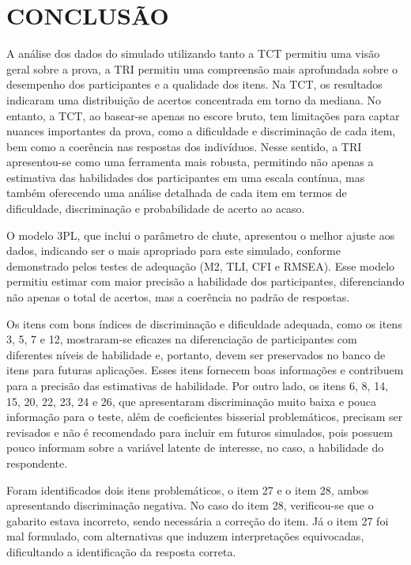 \chapter{CONCLUSÃO}
	

A análise dos dados do simulado utilizando tanto a TCT permitiu uma visão geral sobre a prova, a TRI permitiu uma compreensão mais aprofundada sobre o desempenho dos participantes e a qualidade dos itens. Na TCT, os resultados indicaram uma distribuição de acertos concentrada em torno da mediana. No entanto, a TCT, ao basear-se apenas no escore bruto, tem limitações para captar nuances importantes da prova, como a dificuldade e discriminação de cada item, bem como a coerência nas respostas dos indivíduos. Nesse sentido, a TRI apresentou-se como uma ferramenta mais robusta, permitindo não apenas a estimativa das habilidades dos participantes em uma escala contínua, mas também oferecendo uma análise detalhada de cada item em termos de dificuldade, discriminação e probabilidade de acerto ao acaso.

O modelo 3PL, que inclui o parâmetro de chute, apresentou o melhor ajuste aos dados, indicando ser o mais apropriado para este simulado, conforme demonstrado pelos testes de adequação (M2, TLI, CFI e RMSEA). Esse modelo permitiu estimar com maior precisão a habilidade dos participantes, diferenciando não apenas o total de acertos, mas a coerência no padrão de respostas.

Os itens com bons índices de discriminação e dificuldade adequada, como os itens 3, 5, 7 e 12, mostraram-se eficazes na diferenciação de participantes com diferentes níveis de habilidade e, portanto, devem ser preservados no banco de itens para futuras aplicações. Esses itens fornecem boas informações e contribuem para a precisão das estimativas de habilidade. Por outro lado, os itens 6, 8, 14, 15, 20, 22, 23, 24 e 26, que apresentaram discriminação muito baixa e pouca informação para o teste, além de coeficientes bisserial problemáticos, precisam ser revisados e não é recomendado para incluir em futuros simulados, pois possuem pouco informam sobre a variável latente de interesse, no caso, a habilidade do respondente.

Foram identificados dois itens problemáticos, o item 27 e o item 28, ambos apresentando discriminação negativa. No caso do item 28, verificou-se que o gabarito estava incorreto, sendo necessária a correção do item. Já o item 27 foi mal formulado, com alternativas  que induzem interpretações equivocadas, dificultando a identificação da resposta correta.

